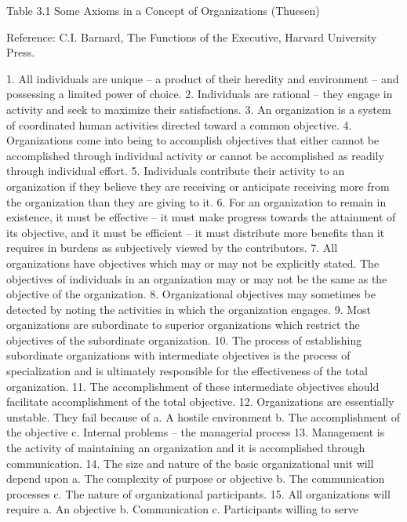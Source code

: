 Table 3.1 Some Axioms in a Concept of Organizations (Thuesen)

Reference: C.I. Barnard, The Functions of the Executive, Harvard University Press.

    1. All individuals are unique – a product of their heredity and environment – and possessing a limited power of choice.
    2. Individuals are rational – they engage in activity and seek to maximize their satisfactions.
    3. An organization is a system of coordinated human activities directed toward a common objective.
    4. Organizations come into being to accomplish objectives that either cannot be accomplished through individual activity or cannot be accomplished as readily through individual effort.
    5. Individuals contribute their activity to an organization if they believe they are receiving or anticipate receiving more from the organization than they are giving to it.
    6. For an organization to remain in existence, it must be effective – it must make progress towards the attainment of its objective, and it must be efficient – it must distribute more benefits than it requires in burdens as subjectively viewed by the contributors.
    7. All organizations have objectives which may or may not be explicitly stated. The objectives of individuals in an organization may or may not be the same as the objective of the organization.
    8. Organizational objectives may sometimes be detected by noting the activities in which the organization engages.
    9. Most organizations are subordinate to superior organizations which restrict the objectives of the subordinate organization.
    10. The process of establishing subordinate organizations with intermediate objectives is the process of specialization and is ultimately responsible for the effectiveness of the total organization.
    11. The accomplishment of these intermediate objectives should facilitate accomplishment of the total objective.
    12. Organizations are essentially unstable. They fail because of 
        a. A hostile environment
        b. The accomplishment of the objective
        c. Internal problems – the managerial process
    13. Management is the activity of maintaining an organization and it is accomplished through communication.
    14. The size and nature of the basic organizational unit will depend upon
        a. The complexity of purpose or objective
        b. The communication processes
        c. The nature of organizational participants.
    15. All organizations will require
        a. An objective
        b. Communication
        c. Participants willing to serve
